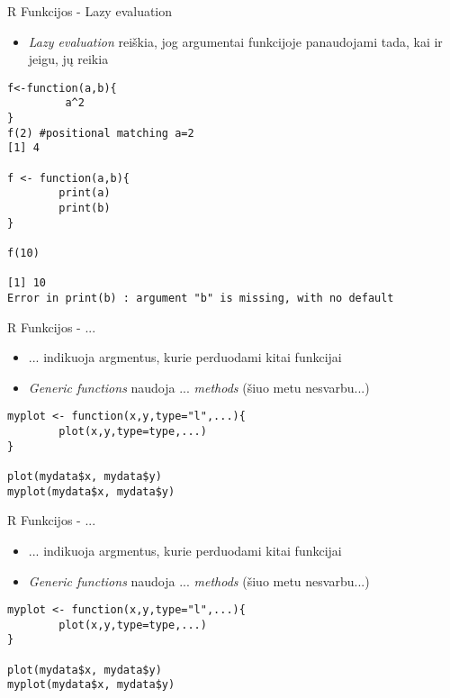 \documentclass[11pt,xcolor=table]{beamer}
\begin{document}
\begin{frame}[fragile]{R Funkcijos - Lazy evaluation}
\begin{itemize}
\item \textit{Lazy evaluation} reiškia, jog argumentai funkcijoje panaudojami tada, kai ir jeigu, jų reikia
\end{itemize}
\begin{lstlisting}
f<-function(a,b){
         a^2
}
f(2) #positional matching a=2
[1] 4

f <- function(a,b){
        print(a)
        print(b)
}

f(10)

[1] 10
Error in print(b) : argument "b" is missing, with no default
\end{lstlisting}
\end{frame}


\begin{frame}[fragile]{R Funkcijos - ...}
\begin{itemize}
\item ... indikuoja argmentus, kurie perduodami kitai funkcijai
\item \textit{Generic functions} naudoja ... \textit{methods} (šiuo metu nesvarbu...)
\end{itemize}
\begin{lstlisting}
myplot <- function(x,y,type="l",...){
        plot(x,y,type=type,...)
}

plot(mydata$x, mydata$y)
myplot(mydata$x, mydata$y)
\end{lstlisting}
\end{frame}


\begin{frame}[fragile]{R Funkcijos - ...}
\begin{itemize}
\item ... indikuoja argmentus, kurie perduodami kitai funkcijai
\item \textit{Generic functions} naudoja ... \textit{methods} (šiuo metu nesvarbu...)
\end{itemize}
\begin{lstlisting}
myplot <- function(x,y,type="l",...){
        plot(x,y,type=type,...)
}

plot(mydata$x, mydata$y)
myplot(mydata$x, mydata$y)
\end{lstlisting}
\end{frame}
\end{document}
